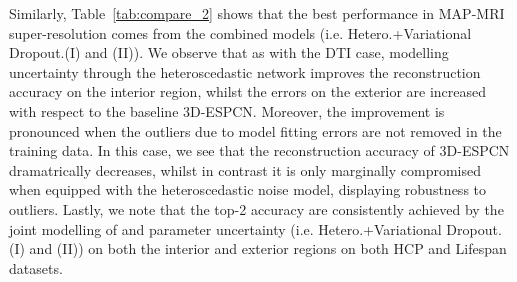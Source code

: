 
Similarly, Table~\ref{tab:compare_2} shows that the best performance in MAP-MRI super-resolution comes from the combined models (i.e. Hetero.+Variational Dropout.(I) and (II)). We observe that as with the DTI case,  modelling  uncertainty through the heteroscedastic network improves the reconstruction accuracy on the interior region, whilst the errors on the exterior are increased with respect to the baseline 3D-ESPCN. Moreover, the improvement is pronounced when the outliers due to model fitting errors are not removed in the training data. In this case, we see that the reconstruction accuracy of 3D-ESPCN dramatrically decreases, whilst in contrast it is only marginally compromised when equipped with the heteroscedastic noise model, displaying robustness to outliers. Lastly, we note that the top-2 accuracy are consistently achieved by the joint modelling of  and parameter uncertainty (i.e. Hetero.+Variational Dropout.(I) and (II)) on both the interior and exterior regions on both HCP and Lifespan datasets.  


